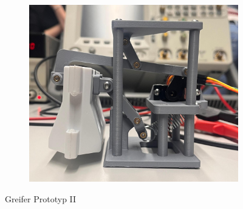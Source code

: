 \begin{figure}[H]
\begin{subfigure}{0.32\textwidth}
\includegraphics[width=0.95\linewidth]{assets/greifer-prototyp/Bild_greifer_2_anheben.jpeg} 
\end{subfigure}
\caption{Greifer Prototyp II }
\label{fig:prototype-greifer}
\end{figure}

